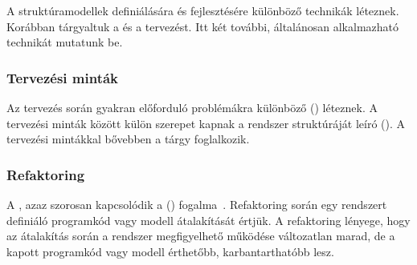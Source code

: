 A struktúramodellek definiálására és fejlesztésére különböző technikák léteznek. Korábban tárgyaltuk a  és a  tervezést. Itt két további, általánosan alkalmazható technikát mutatunk be.

\subsubsection{Tervezési minták}

Az  tervezés során gyakran előforduló problémákra különböző  () léteznek. A tervezési minták között külön szerepet kapnak a rendszer struktúráját leíró  (). A tervezési mintákkal bővebben a \sznikak tárgy foglalkozik.

\subsubsection{Refaktoring}

A , azaz  szorosan kapcsolódik a  () fogalma~\cite{fowler2012refactoring}. Refaktoring során egy rendszert definiáló programkód vagy modell átalakítását értjük. A refaktoring lényege, hogy az átalakítás során a rendszer megfigyelhető működése változatlan marad, de a kapott programkód vagy modell érthetőbb, karbantarthatóbb lesz.

%
%
%
%
%



